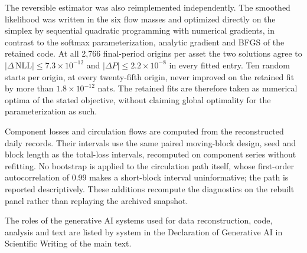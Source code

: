 The reversible estimator was also reimplemented independently. The smoothed likelihood was written in the six flow masses and optimized directly on the simplex by sequential quadratic programming with numerical gradients, in contrast to the softmax parameterization, analytic gradient and BFGS of the retained code. At all 2,766 final-period origins per asset the two solutions agree to $|\Delta\,\text{NLL}|\le7.3\times10^{-12}$ and $|\Delta P|\le2.2\times10^{-8}$ in every fitted entry. Ten random starts per origin, at every twenty-fifth origin, never improved on the retained fit by more than $1.8\times10^{-12}$ nats. The retained fits are therefore taken as numerical optima of the stated objective, without claiming global optimality for the parameterization as such.

Component losses and circulation flows are computed from the reconstructed daily records. Their intervals use the same paired moving-block design, seed and block length as the total-loss intervals, recomputed on component series without refitting. No bootstrap is applied to the circulation path itself, whose first-order autocorrelation of 0.99 makes a short-block interval uninformative; the path is reported descriptively. These additions recompute the diagnostics on the rebuilt panel rather than replaying the archived snapshot.

The roles of the generative AI systems used for data reconstruction, code,
analysis and text are listed by system in the Declaration of Generative AI in
Scientific Writing of the main text.
